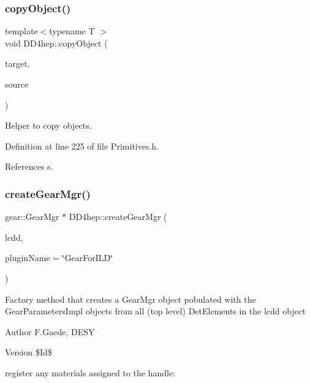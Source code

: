 \subsubsection{\texorpdfstring{copy\+Object()}{copyObject()}}
{\footnotesize\ttfamily template$<$typename T $>$ \\
void D\+D4hep\+::copy\+Object (\begin{DoxyParamCaption}\item[{void $\ast$}]{target,  }\item[{const void $\ast$}]{source }\end{DoxyParamCaption})\hspace{0.3cm}{\ttfamily [inline]}}



Helper to copy objects. 



Definition at line 225 of file Primitives.\+h.



References s.

\hypertarget{namespace_d_d4hep_aeaa49904e5fff3d47fa8fd9600655f3e}{}\label{namespace_d_d4hep_aeaa49904e5fff3d47fa8fd9600655f3e} 
\subsubsection{\texorpdfstring{create\+Gear\+Mgr()}{createGearMgr()}}
{\footnotesize\ttfamily gear\+::\+Gear\+Mgr $\ast$ D\+D4hep\+::create\+Gear\+Mgr (\begin{DoxyParamCaption}\item[{\hyperlink{class_d_d4hep_1_1_geometry_1_1_l_c_d_d}{Geometry\+::\+L\+C\+DD} \&}]{lcdd,  }\item[{const std\+::string \&}]{plugin\+Name = {\ttfamily \char`\"{}GearForILD\char`\"{}} }\end{DoxyParamCaption})}

Factory method that creates a Gear\+Mgr object pobulated with the Gear\+Parameters\+Impl objects from all (top level) Det\+Elements in the lcdd object \begin{DoxyAuthor}{Author}
F.\+Gaede, D\+E\+SY 
\end{DoxyAuthor}
\begin{DoxyVersion}{Version}
\$\+Id\$ 
\end{DoxyVersion}
register any materials assigned to the handle\+: 

